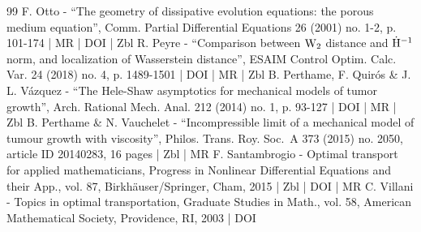 \documentclass[10pt]{amsart}
\theoremstyle{plain}
\theoremstyle{remark}
\begin{document}
\begin{thebibliography}{99}
F. Otto - “The geometry of dissipative evolution equations: the porous medium equation”, Comm. Partial Differential Equations 26 (2001) no. 1-2, p. 101-174 | MR | DOI | Zbl
R. Peyre - “Comparison between $\rm W_2$ distance and $\dot{\rm H}^{-1}$ norm, and localization of Wasserstein distance”, ESAIM Control Optim. Calc. Var. 24 (2018) no. 4, p. 1489-1501 | DOI | MR | Zbl
B. Perthame, F. Quirós \& J. L. Vázquez - “The Hele-Shaw asymptotics for mechanical models of tumor growth”, Arch. Rational Mech. Anal. 212 (2014) no. 1, p. 93-127 | DOI | MR | Zbl
B. Perthame \& N. Vauchelet - “Incompressible limit of a mechanical model of tumour growth with viscosity”, Philos. Trans. Roy. Soc. A 373 (2015) no. 2050, article ID 20140283, 16 pages | Zbl | MR
F. Santambrogio - Optimal transport for applied mathematicians, Progress in Nonlinear Differential Equations and their App., vol. 87, Birkhäuser/Springer, Cham, 2015 | Zbl | DOI | MR
C. Villani - Topics in optimal transportation, Graduate Studies in Math., vol. 58, American Mathematical Society, Providence, RI, 2003 | DOI
\end{thebibliography}
\end{document}
